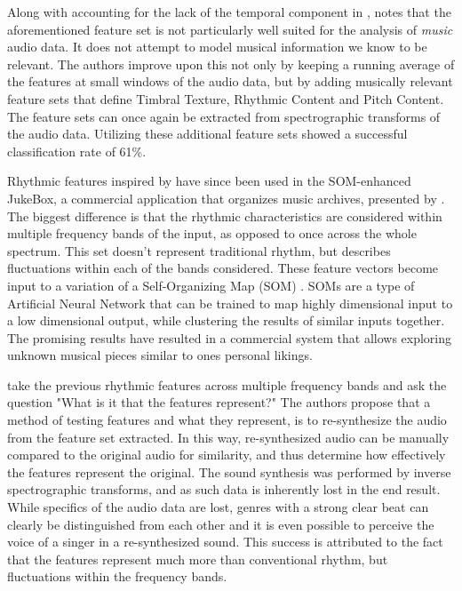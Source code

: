 \documentclass[12pt]{article}
\begin{document}
Along with accounting for the lack of the temporal component in \citet{Wold96}, \citet{Tzanetakis02} notes that the aforementioned feature set is not particularly well suited for the analysis of \textit{music} audio data. It does not attempt to model musical information we know to be relevant. The authors improve upon this not only by keeping a running average of the features at small windows of the audio data, but by adding musically relevant feature sets that define Timbral Texture, Rhythmic Content and Pitch Content. The feature sets can once again be extracted from spectrographic transforms of the audio data. Utilizing these additional feature sets showed a successful classification rate of 61\%.

Rhythmic features inspired by \citet{Tzanetakis02} have since been used in the SOM-enhanced JukeBox, a commercial application that organizes music archives, presented by \citet{rauber2003som}. The biggest difference is that the rhythmic characteristics are considered within multiple frequency bands of the input, as opposed to once across the whole spectrum. This set doesn't represent traditional rhythm, but describes fluctuations within each of the bands considered. These feature vectors become input to a variation of a Self-Organizing Map (SOM) \citep{kohonen2002make}. SOMs are a type of Artificial Neural Network that can be trained to map highly dimensional input to a low dimensional output, while clustering the results of similar inputs together. The promising results have resulted in a commercial system that allows exploring unknown musical pieces similar to ones personal likings.

\citet{Lidy05} take the previous rhythmic features across multiple frequency bands and ask the question "What is it that the features represent?" The authors propose that a method of testing features and what they represent, is to re-synthesize the audio from the feature set extracted. In this way, re-synthesized audio can be manually compared to the original audio for similarity, and thus determine how effectively the features represent the original. The sound synthesis was performed by inverse spectrographic transforms, and as such data is inherently lost in the end result. While specifics of the audio data are lost, genres with a strong clear beat can clearly be distinguished from each other and it is even possible to perceive the voice of a singer in a re-synthesized sound. This success is attributed to the fact that the features represent much more than conventional rhythm, but fluctuations within the frequency bands.
\end{document}
